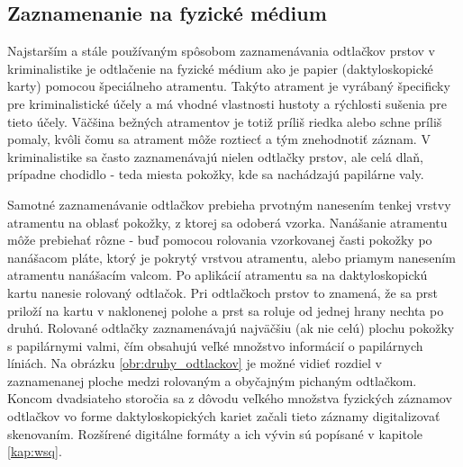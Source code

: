   \subsection{Zaznamenanie na fyzické médium}
  Najstarším a stále používaným spôsobom zaznamenávania odtlačkov prstov v kriminalistike je odtlačenie na fyzické médium ako je papier (daktyloskopické karty)
  pomocou špeciálneho atramentu. Takýto atrament je vyrábaný špecificky pre kriminalistické účely a má vhodné vlastnosti hustoty a rýchlosti sušenia pre tieto
  účely. Väčšina bežných atramentov je totiž príliš riedka alebo schne príliš pomaly, kvôli čomu sa atrament môže roztiecť a tým znehodnotiť záznam.
  V kriminalistike sa často zaznamenávajú nielen odtlačky prstov, ale celá dlaň, prípadne chodidlo - teda miesta pokožky, kde sa nachádzajú papilárne valy.

  Samotné zaznamenávanie odtlačkov prebieha prvotným nanesením tenkej vrstvy atramentu na oblasť pokožky, z ktorej sa odoberá vzorka. Nanášanie atramentu môže
  prebiehať rôzne - buď pomocou rolovania vzorkovanej časti pokožky po nanášacom pláte, ktorý je pokrytý vrstvou atramentu, alebo priamym nanesením atramentu
  nanášacím valcom. Po aplikácií atramentu sa na daktyloskopickú kartu nanesie rolovaný odtlačok. Pri odtlačkoch prstov to znamená, že sa prst priloží
  na kartu v naklonenej polohe a prst sa roluje od jednej hrany nechta po druhú. Rolované odtlačky zaznamenávajú najväčšiu (ak nie celú) plochu pokožky
  s papilárnymi valmi, čím obsahujú veľké množstvo informácií o papilárnych líniách. Na obrázku \ref{obr:druhy_odtlackov} je možné vidieť rozdiel v zaznamenanej
  ploche medzi rolovaným a obyčajným pichaným odtlačkom. Koncom dvadsiateho storočia sa z dôvodu veľkého množstva fyzických záznamov odtlačkov vo forme
  daktyloskopických kariet začali tieto záznamy digitalizovať skenovaním. Rozšírené digitálne formáty a ich vývin sú popísané v kapitole \ref{kap:wsq}.

